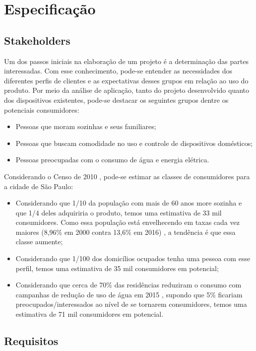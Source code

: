 \chapter{Especificação}

\section{Stakeholders}
Um dos passos iniciais na elaboração de um projeto é a determinação das partes interessadas. Com esse conhecimento, pode-se entender as necessidades dos diferentes perfis de clientes e as expectativas desses grupos em relação ao uso do produto. Por meio da análise de aplicação, tanto do projeto desenvolvido quanto dos dispositivos existentes, pode-se destacar os seguintes grupos dentre os potenciais consumidores:

\begin{itemize}
\item Pessoas que moram sozinhas e seus familiares;
\item Pessoas que buscam comodidade no uso e controle de dispositivos domésticos;
\item Pessoas preocupadas com o consumo de água e energia elétrica.
\end{itemize}

Considerando o Censo de 2010 \cite{ibge}, pode-se estimar as classes de consumidores para a cidade de São Paulo:

\begin{itemize}
\item Considerando que 1/10 da população com mais de 60 anos more sozinha e que 1/4 deles adquiriria o produto, temos uma estimativa de 33 mil consumidores. Como essa população está envelhecendo em taxas cada vez maiores (8,96\% em 2000 contra 13,6\% em 2016) \cite{bibliotecaVirtual}, a tendência é que essa classe aumente;
\item Considerando que 1/100 dos domicílios ocupados tenha uma pessoa com esse perfil, temos uma estimativa de 35 mil consumidores em potencial;
\item Considerando que cerca de 70\% das residências reduziram o consumo com campanhas de redução de uso de água em 2015 \cite{g1}, supondo que 5\% ficariam preocupados/interessados ao nível de se tornarem consumidores, temos uma estimativa de 71 mil consumidores em potencial.
\end{itemize}

\section{Requisitos \label{sec:requisitos}}

